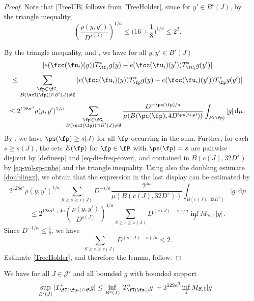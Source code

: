     \begin{proof}
        \leanok
        Note that \eqref{TreeUB} follows from \eqref{TreeHolder}, since for $y'\in B^\circ{}(J)$, by the triangle inequality,
        $$\left(\frac{\rho(y,y')}{D^{s(J)}}\right)^{1/a}\le \Big(16 + \frac{1}8\Big)^{1/a}\le 2^2.$$

        By the triangle inequality,  and , we have for all $y, y' \in B'(J)$
        \begin{equation}
            \label{eq-C-Lip}
            |e(\fcc(\fu_i)(y)) T_{\fC_i}^* g(y) - e(\fcc(\fu_i)(y')) T_{\fC_i}^* g(y')|
        \end{equation}
        $$
            \le \sum_{\substack{\fp \in \fC_i\\ B(\scI(\fp)) \cap B'(J) \neq \emptyset}} |e(\fcc(\fu_i)(y)) T_{\fp}^* g(y) - e(\fcc(\fu_i)(y')) T_{\fp}^* g(y')|
        $$
        $$
            \le 2^{128a^3}\rho(y,y')^{1/a} \sum_{\substack{\fp \in \fC_i\\ B(\scI(\fp)) \cap B'(J) \neq \emptyset}} \frac{D^{- \ps(\fp)/a}}{\mu(B(\pc(\fp), 4D^{\ps(\fp)}))} \int_{E(\fp)} |g| \, \mathrm{d}\mu\,.
        $$
        By , we have $\ps(\fp) \ge s(J)$ for all $\fp$ occurring in the sum. Further, for each $s \ge s(J)$, the sets $E(\fp)$ for $\fp \in \fP$ with $\ps(\fp) = s$ are pairwise disjoint by \eqref{defineep} and \eqref{eq-dis-freq-cover}, and contained in $B(c(J), 32D^{s})$ by \eqref{eq-vol-sp-cube} and the triangle inequality. Using also the doubling estimate \eqref{doublingx}, we obtain that the expression in the last display can be estimated by
        $$
            2^{128a^3}\rho(y,y')^{1/a} \sum_{S \ge s \ge s(J)} D^{-s/a} \frac{2^{4a}}{\mu(B(c(J), 32D^{s}))} \int_{B(c(J), 32D^{s})} |g| \, \mathrm{d}\mu
        $$
        $$
            \le 2^{128a^3+4a} \left(\frac{\rho(y,y')}{D^{s(J)}}\right)^{1/a} \sum_{S \ge s \ge s(J)} D^{(s(J) - s)/a} \inf_J M_{\mathcal{B},1} |g|\,.
        $$
        Since $D^{-1/a}\le\frac12$, we have
        $$
            \sum_{S \ge s \ge s(J)} D^{(s(J) - s)/a} \le 2.
        $$
        Estimate \eqref{TreeHolder}, and therefore the lemma, follow.
    \end{proof}

    \begin{lemma}
        \label{global-tree-control-2}
        \leanok
        We have for all $J \in \mathcal{J}'$ and all bounded $g$ with bounded support
        $$
            \sup_{B'(J)} |T^*_{\fT(\fu_2) \cap \mathfrak{S}} g| \le \inf_{B^\circ{}(J)} |T^*_{\fT(\fu_2)} g| + 2^{129a^3} \inf_{J} M_{\mathcal{B},1}|g|\,.
        $$
    \end{lemma}

